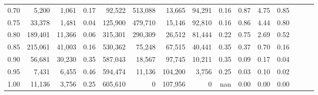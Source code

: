 \begin{tabular}{rrrrrrrrrrrrrrr}
0.70 &    5,200 &   1,061 &  0.17 &   92,522 &  513,088 &   13,665 &   94,291 &  0.16 &  0.87 &  4.75 &      0.85 \\
0.75 &   33,378 &   1,481 &  0.04 &  125,900 &  479,710 &   15,146 &   92,810 &  0.16 &  0.86 &  4.44 &      0.80 \\
0.80 &  189,401 &  11,366 &  0.06 &  315,301 &  290,309 &   26,512 &   81,444 &  0.22 &  0.75 &  2.69 &      0.52 \\
0.85 &  215,061 &  41,003 &  0.16 &  530,362 &   75,248 &   67,515 &   40,441 &  0.35 &  0.37 &  0.70 &      0.16 \\
0.90 &   56,681 &  30,230 &  0.35 &  587,043 &   18,567 &   97,745 &   10,211 &  0.35 &  0.09 &  0.17 &      0.04 \\
0.95 &    7,431 &   6,455 &  0.46 &  594,474 &   11,136 &  104,200 &    3,756 &  0.25 &  0.03 &  0.10 &      0.02 \\
1.00 &   11,136 &   3,756 &  0.25 &  605,610 &        0 &  107,956 &        0 &   nan &  0.00 &  0.00 &      0.00 \\
\bottomrule
\end{tabular}
